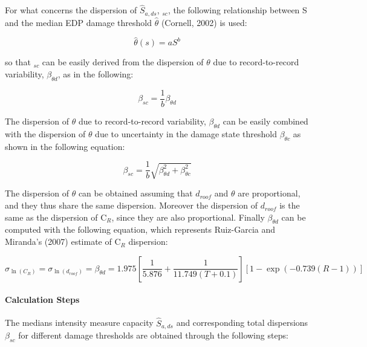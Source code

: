 For what concerns the dispersion of $\hat{S}_{a,ds}$, \beta$_{sc}$, the following relationship between S and the median EDP damage threshold $\hat{\theta}$ (Cornell, 2002) is used:

\begin{equation}
\hat{\theta}(s) = a S^b
\end{equation}

so that \beta$_{sc}$ can be easily derived from the dispersion of $\theta$ due to record-to-record variability, $\beta_{\theta d}$, as in the following:

\begin{equation}
\beta_{sc} = \frac{1}{b} \beta_{\theta d}
\label{eq:betaSa_RGM}
\end{equation}

The dispersion of $\theta$ due to record-to-record variability, $\beta_{\theta d}$ can be easily combined with the dispersion of $\theta$ due to uncertainty in the damage state threshold $\beta_{\theta c}$ as shown in the following equation:

\begin{equation}
\beta_{sc} = \frac{1}{b} \sqrt{\beta_{\theta d}^2 + \beta_{\theta c}^2}
\label{eq:betaSc_RGM}
\end{equation}

The dispersion of $\theta$ can be obtained assuming that $d_{roof}$ and $\theta$ are proportional, and they thus share the same dispersion. Moreover the dispersion of $d_{roof}$ is the same as the dispersion of C$_R$, since they are also proportional. Finally $\beta_{\theta d}$ can be computed with the following equation, which represents Ruiz-Garcia and Miranda's (2007) estimate of C$_R$ dispersion:

\begin{equation}
\sigma_{\ln(C_R)} = \sigma_{\ln(d_{roof})} = \beta_{\theta d} =  1.975 [\frac{1}{5.876} + \frac{1}{11.749 (T + 0.1)}] [1- \exp(-0.739 (R - 1))]
\end{equation}

\paragraph{Calculation Steps}
\label{subsec:CalculationSteps}
The medians intensity measure capacity $\hat{S}_{a,ds}$ and corresponding total dispersions $\beta_{sc}$ for different damage thresholds are obtained through the following steps:

